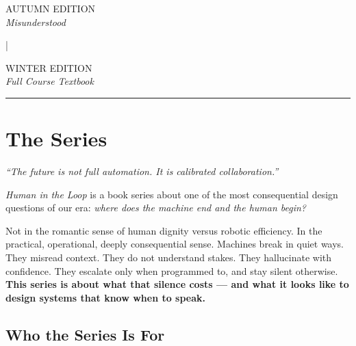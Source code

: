 \documentclass[12pt, a4paper]{article}
\newcommand{\amberrule}{%
  {\color{rulecolor}\rule{\linewidth}{0.5pt}}%
}
\newcommand{\seriesname}{\textit{Human in the Loop}}
\newcommand{\tagline}{\textit{``The future is not full automation. It is calibrated collaboration.''}}
\begin{document}
\begin{center}
  \vspace{0.6cm}

  \begin{minipage}{0.48\textwidth}
    \centering
    {\footnotesize\color{autumnred}\sffamily AUTUMN EDITION}\\
    {\small\itshape Misunderstood}
  \end{minipage}%
  \begin{minipage}{0.04\textwidth}\centering\color{amber}|\end{minipage}%
  \begin{minipage}{0.48\textwidth}
    \centering
    {\footnotesize\color{winterblue}\sffamily WINTER EDITION}\\
    {\small\itshape Full Course Textbook}
  \end{minipage}

  \vspace{2.5cm}
  \amberrule
  \vspace{0.5cm}

  {\footnotesize\color{midgrey}}

\end{center}

\newpage

\section{The Series}

\begin{tcolorbox}[callout]
\tagline
\end{tcolorbox}

\vspace{10pt}

\seriesname{} is a book series about one of the most consequential design questions of our era: \textit{where does the machine end and the human begin?}

Not in the romantic sense of human dignity versus robotic efficiency. In the practical, operational, deeply consequential sense. Machines break in quiet ways. They misread context. They do not understand stakes. They hallucinate with confidence. They escalate only when programmed to, and stay silent otherwise. \textbf{This series is about what that silence costs — and what it looks like to design systems that know when to speak.}

\subsection{Who the Series Is For}
\end{document}
